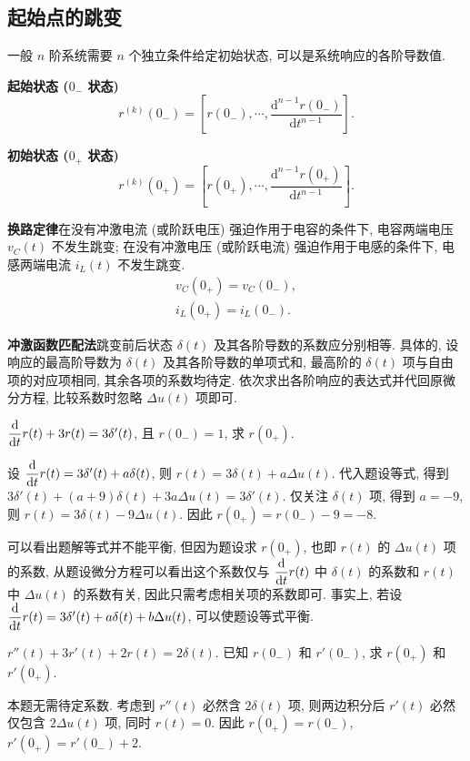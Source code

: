 \subsection{起始点的跳变} \label{起始点的跳变}

一般 $n$ 阶系统需要 $n$ 个独立条件给定初始状态, 可以是系统响应的各阶导数值.

\textbf{起始状态 ($0_{-}$ 状态)}
\begin{equation}
    r^{(k)}(0_{-})=\left[r(0_{-}),\cdots,\frac{\mathrm{d}^{n-1}r(0_{-})}{\mathrm{d}t^{n-1}}\right].
\end{equation}

\textbf{初始状态 ($0_{+}$ 状态)}
\begin{equation}
    r^{(k)}(0_{+})=\left[r(0_{+}),\cdots,\frac{\mathrm{d}^{n-1}r(0_{+})}{\mathrm{d}t^{n-1}}\right].
\end{equation}

\textbf{换路定律}\quad 在没有冲激电流 (或阶跃电压) 强迫作用于电容的条件下, 电容两端电压 $v_C(t)$ 不发生跳变; 在没有冲激电压 (或阶跃电流) 强迫作用于电感的条件下, 电感两端电流 $i_L(t)$ 不发生跳变.
\begin{gather}
    v_C(0_{+})=v_C(0_{-}), \label{eq:2.2 transformation theorem v_C} \\
    i_L(0_{+})=i_L(0_{-}). \label{eq:2.2 transformation theorem i_L}
\end{gather}

\textbf{冲激函数匹配法}\quad 跳变前后状态 $\delta(t)$ 及其各阶导数的系数应分别相等. 具体的, 设响应的最高阶导数为 $\delta(t)$ 及其各阶导数的单项式和, 最高阶的 $\delta(t)$ 项与自由项的对应项相同, 其余各项的系数均待定. 依次求出各阶响应的表达式并代回原微分方程, 比较系数时忽略 $\Delta u(t)$ 项即可.

\begin{exampleprob}
    $\ddd{1}{t}r(t)+3r(t)=3\delta'(t)$, 且 $r(0_-)=1$, 求 $r(0_+)$.

    \begin{solution}
        设 $\ddd{1}{t}r(t)=3\delta'(t)+a\delta(t)$, 则 $r(t)=3\delta(t)+a\Delta u(t)$. 代入题设等式, 得到 $3\delta'(t)+(a+9)\delta(t)+3a\Delta u(t)=3\delta'(t)$. {\color{red} 仅关注 $\delta(t)$ 项}, 得到 $a=-9$, 则 $r(t)=3\delta(t)-9\Delta u(t)$. 因此 $r(0_+)=r(0_-)-9=-8$.

        可以看出题解等式并不能平衡, 但因为题设求 $r(0_+)$, 也即 $r(t)$ 的 $\Delta u(t)$ 项的系数, 从题设微分方程可以看出这个系数仅与 $\ddd{1}{t}r(t)$ 中 $\delta(t)$ 的系数和 $r(t)$ 中 $\Delta u(t)$ 的系数有关, 因此只需考虑相关项的系数即可. 事实上, 若设 $\ddd{1}{t}r(t)=3\delta'(t)+a\delta(t)+b\Delta u(t)$, 可以使题设等式平衡.
    \end{solution}
\end{exampleprob}

\begin{exampleprob}
    $r''(t)+3r'(t)+2r(t)=2\delta(t)$. 已知 $r(0_-)$ 和 $r'(0_-)$, 求 $r(0_+)$ 和 $r'(0_+)$.

    \begin{solution}
        本题无需待定系数. 考虑到 $r''(t)$ 必然含 $2\delta(t)$ 项, 则两边积分后 $r'(t)$ 必然{\color{red} 仅}包含 $2\Delta u(t)$ 项, 同时 $r(t)=0$. 因此 $r(0_+)=r(0_-)$, $r'(0_+)=r'(0_-)+2$.
    \end{solution}
\end{exampleprob}
